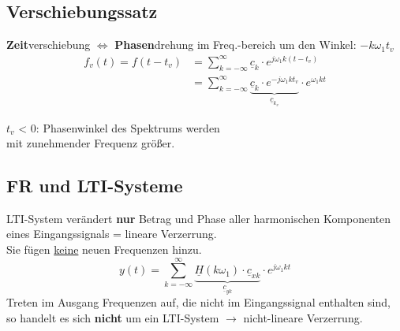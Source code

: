 \subsection{Verschiebungssatz}
\textbf{Zeit}verschiebung $\Leftrightarrow$ \textbf{Phasen}drehung im Freq.-bereich um den Winkel: $-k\omega_1 t_v$
\begin{align*}
	f_v(t) = f(t-t_v) & = \sum_{k=-\infty}^{\infty} \underline{c}_k\cdot e^{j\omega_1 k (t-t_v)}                                                       \\
	                  & = \sum_{k=-\infty}^{\infty} \underbrace{\underline{c}_k\cdot e^{-j\omega_1 k t_v}}_{\underline{c}_{k_v}} \cdot e^{\omega_1 k t}
\end{align*}

$t_v$ < 0: Phasenwinkel des Spektrums werden\\ mit
zunehmender Frequenz größer.

\subsection{FR und LTI-Systeme}
{\small LTI-System verändert \textbf{nur} Betrag und Phase aller harmonischen Komponenten eines Eingangssignals = lineare Verzerrung.\\
Sie fügen \underline{keine} neuen Frequenzen hinzu.}
\[
	y(t) = \sum_{k=-\infty}^{\infty} \underbrace{\underline{H}(k\omega_1)\cdot\underline{c}_{xk}}_{\underline{c}_{yk}} \cdot e^{j\omega_1 k t}
\]
{\small Treten im Ausgang Frequenzen auf, die nicht im Eingangssignal enthalten sind, so handelt es sich \textbf{nicht} um ein LTI-System $\rightarrow$ nicht-lineare Verzerrung.}
